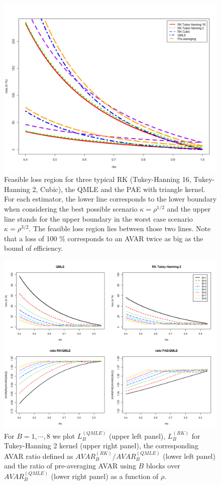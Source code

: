 \documentclass[11pt]{article}
\numberwithin{equation}{section}
\theoremstyle{plain}
\theoremstyle{remark}
\begin{document}
\begin{figure}
\includegraphics[width=1\linewidth]{RplotGlobal.png}
\centering
\caption{Feasible loss region for three typical RK (Tukey-Hanning 16, Tukey-Hanning 2, Cubic), the QMLE and the PAE with triangle kernel. For each estimator, the lower line corresponds to the lower boundary when considering the best possible scenario $\kappa = \rho^{1/2}$ and the upper line stands for the upper boundary in the worst case scenario $\kappa = \rho^{3/2}$. The feasible loss region lies between those two lines. Note that a loss of 100 \% corresponds to an AVAR twice as big as the bound of efficiency.}
\label{efficiencyGlob}
\end{figure}

\begin{figure}
\includegraphics[width=1\linewidth]{RplotAVARblockmod2.png}
\centering
\caption{For $B=1, \cdots,8$ we plot $L_B^{(QMLE)}$ (upper left panel), $L_B^{(RK)}$ for Tukey-Hanning 2 kernel (upper right panel), the corresponding AVAR ratio defined as $AVAR_{B}^{(RK)}/AVAR_{B}^{(QMLE)}$ (lower left panel) and the ratio of pre-averaging AVAR using $B$ blocks over $AVAR_{B}^{(QMLE)}$ (lower right panel) as a function of $\rho$.}
\label{AVARblockmod2}
\end{figure}
\end{document}
